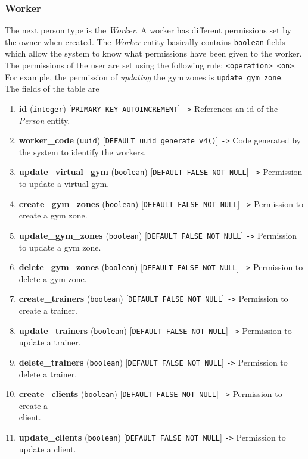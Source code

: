 \documentclass[a4paper, 12pt, oneside]{book}
\begin{document}
\subsubsection{Worker}
The next person type is the \emph{Worker}. A worker has different permissions set by the owner when created. The \emph{Worker} entity basically contains \texttt{boolean} fields which allow the system to know what permissions have been given to the worker. The permissions of the user are set using the following rule: \texttt{<operation>\_<on>}. For example, the permission of \emph{updating} the gym zones is \texttt{update\_gym\_zone}.
\\[8pt]
The fields of the table are
\begin{enumerate}[label = -]
	\item \textbf{id} (\texttt{integer}) [\texttt{PRIMARY KEY AUTOINCREMENT}] \texttt{->} References an id of the \emph{Person} entity.
	\item \textbf{worker\_code} (\texttt{uuid}) [\texttt{DEFAULT uuid\_generate\_v4()}] \texttt{->} Code generated by the system to identify the workers.
	\item \textbf{update\_virtual\_gym} (\texttt{boolean}) [\texttt{DEFAULT FALSE NOT NULL}] \texttt{->} Permission to update a virtual gym.
	\item \textbf{create\_gym\_zones} (\texttt{boolean}) [\texttt{DEFAULT FALSE NOT NULL}] \texttt{->} Permission to create a gym zone.
	\item \textbf{update\_gym\_zones} (\texttt{boolean}) [\texttt{DEFAULT FALSE NOT NULL}] \texttt{->} Permission to update a gym zone.
	\item \textbf{delete\_gym\_zones} (\texttt{boolean}) [\texttt{DEFAULT FALSE NOT NULL}] \texttt{->} Permission to\\delete a gym zone.
	\item \textbf{create\_trainers} (\texttt{boolean}) [\texttt{DEFAULT FALSE NOT NULL}] \texttt{->} Permission to create a trainer.
	\item \textbf{update\_trainers} (\texttt{boolean}) [\texttt{DEFAULT FALSE NOT NULL}] \texttt{->} Permission to update a trainer.
	\item \textbf{delete\_trainers} (\texttt{boolean}) [\texttt{DEFAULT FALSE NOT NULL}] \texttt{->} Permission to delete a trainer.
	\item \textbf{create\_clients} (\texttt{boolean}) [\texttt{DEFAULT FALSE NOT NULL}] \texttt{->} Permission to create a\\client.
	\item \textbf{update\_clients} (\texttt{boolean}) [\texttt{DEFAULT FALSE NOT NULL}] \texttt{->} Permission to update a client.

\end{enumerate}
\end{document}
